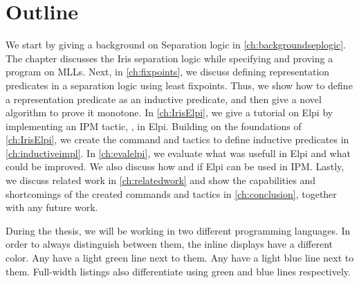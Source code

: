 \documentclass[thesis.tex]{subfiles}
\begin{document}
\section{Outline}
We start by giving a background on Separation logic in \cref{ch:backgroundseplogic}. The chapter discusses the Iris separation logic while specifying and proving a program on MLLs. Next, in \cref{ch:fixpoints}, we discuss defining representation predicates in a separation logic using least fixpoints. Thus, we show how to define a representation predicate as an inductive predicate, and then give a novel algorithm to prove it monotone. In \cref{ch:IrisElpi}, we give a tutorial on Elpi by implementing an IPM tactic, , in Elpi. Building on the foundations of \cref{ch:IrisElpi}, we create the command and tactics to define inductive predicates in \cref{ch:inductiveimpl}. In \cref{ch:evalelpi}, we evaluate what was usefull in Elpi and what could be improved. We also discuss how and if Elpi can be used in IPM. Lastly, we discuss related work in \cref{ch:relatedwork} and show the capabilities and shortcomings of the created commands and tactics in \cref{ch:conclusion}, together with any future work.

During the thesis, we will be working in two different programming languages. In order to always distinguish between them, the inline displays have a different color. Any  have a light green line next to them. Any  have a light blue line next to them. Full-width listings also differentiate using green and blue lines respectively.

\end{document}
